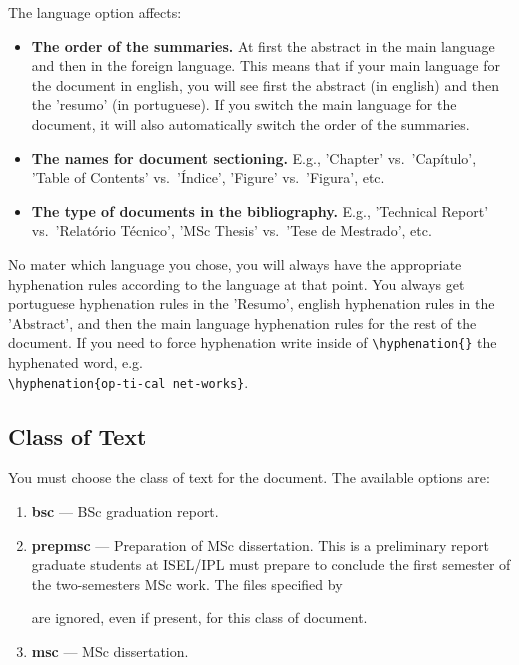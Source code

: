The language option affects:
\begin{itemize}
	\item \textbf{The order of the summaries.} At first the abstract in the main language and then in the foreign language. This means that if your main language for the document in english, you will see first the abstract (in english) and then the 'resumo' (in portuguese). If you switch the main language for the document, it will also automatically switch the order of the summaries.
	\item \textbf{The names for document sectioning.} E.g., 'Chapter' vs.\ 'Capítulo', 'Table of Contents' vs.\ 'Índice', 'Figure' vs.\ 'Figura', etc.
	\item \textbf{The type of documents in the bibliography.} E.g., 'Technical Report' vs.\ 'Relatório Técnico', 'MSc Thesis' vs.\ 'Tese de Mestrado', etc.
\end{itemize} 

No mater which language you chose, you will always have the appropriate hyphenation rules according to the language at that point. You always get portuguese hyphenation rules in the 'Resumo', english hyphenation rules in the 'Abstract', and then the main language hyphenation rules for the rest of the document. If you need to force hyphenation write inside of \verb!\hyphenation{}! the hyphenated word, e.g. \\
\verb!\hyphenation{op-ti-cal net-works}!.

\subsection{Class of Text} %
\label{sub:class_of_text}

You must choose the class of text for the document. The available options are:

\begin{enumerate}
	\item \textbf{bsc} --- BSc graduation report.
	\item \textbf{prepmsc} --- Preparation of MSc dissertation. This is a preliminary report graduate students at ISEL/IPL must prepare to conclude the first semester of the two-semesters MSc work. The files specified by 
	are ignored, even if present, for this class of document.
	\item \textbf{msc} --- MSc dissertation.
\end{enumerate}
%

